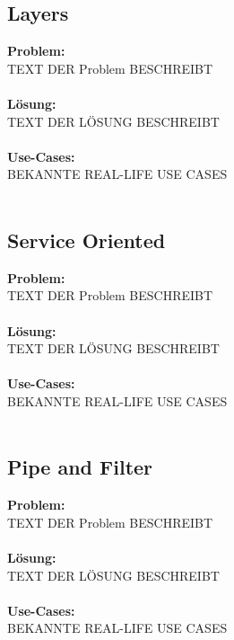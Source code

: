 \documentclass[../main.tex]{subfiles}
\begin{document}
	\subsection{Layers}
	\textbf{Problem:}\\
	TEXT DER Problem BESCHREIBT\\\\
	\textbf{Lösung:}\\
	TEXT DER LÖSUNG BESCHREIBT\\\\
	\textbf{Use-Cases:}\\
	BEKANNTE REAL-LIFE USE CASES\\\\
	\clearpage	
	
	\subsection{Service Oriented}
	\textbf{Problem:}\\
	TEXT DER Problem BESCHREIBT\\\\
	\textbf{Lösung:}\\
	TEXT DER LÖSUNG BESCHREIBT\\\\
	\textbf{Use-Cases:}\\
	BEKANNTE REAL-LIFE USE CASES\\\\
	\clearpage		
	
	\subsection{Pipe and Filter}
	\textbf{Problem:}\\
	TEXT DER Problem BESCHREIBT\\\\
	\textbf{Lösung:}\\
	TEXT DER LÖSUNG BESCHREIBT\\\\
	\textbf{Use-Cases:}\\
	BEKANNTE REAL-LIFE USE CASES\\\\
	\clearpage	
	
\end{document}
